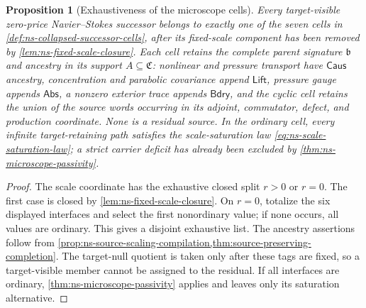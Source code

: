 \documentclass[11pt]{article}
\numberwithin{section}{part}
\theoremstyle{plain}
\newtheorem{proposition}[proposition]{Proposition}
\theoremstyle{definition}
\theoremstyle{remark}
\newcommand{\Caus}{\mathsf{Caus}}
\newcommand{\Abs}{\mathsf{Abs}}
\newcommand{\Lift}{\mathsf{Lift}}
\newcommand{\Bdry}{\mathsf{Bdry}}
\newcommand{\Channels}{\mathfrak C}
\begin{document}
\begin{proposition}[Exhaustiveness of the microscope cells]
\label{prop:ns-collapsed-cell-exhaustion}
Every target-visible zero-price Navier--Stokes successor belongs to exactly
one of the seven cells in
\cref{def:ns-collapsed-successor-cells}, after its fixed-scale component has
been removed by \cref{lem:ns-fixed-scale-closure}.  Each cell retains the
complete parent signature \(\mathfrak b\) and ancestry in its support
\(A\subseteq\Channels\): nonlinear and pressure transport have \(\Caus\)
ancestry, concentration and parabolic covariance append \(\Lift\), pressure
gauge appends \(\Abs\), a nonzero exterior trace appends \(\Bdry\), and the
cyclic cell retains the union of the source words occurring in its adjoint,
commutator, defect, and production coordinate.
None is a residual source.
In the ordinary cell, every infinite target-retaining path satisfies the
scale-saturation law \eqref{eq:ns-scale-saturation-law}; a strict carrier
deficit has already been excluded by \cref{thm:ns-microscope-passivity}.
\end{proposition}

\begin{proof}
The scale coordinate has the exhaustive closed split \(r>0\) or \(r=0\).
The first case is closed by \cref{lem:ns-fixed-scale-closure}.  On \(r=0\),
totalize the six displayed interfaces and select the first nonordinary value;
if none occurs, all values are ordinary.  This gives a disjoint exhaustive
list.  The ancestry assertions follow from
\cref{prop:ns-source-scaling-compilation,thm:source-preserving-completion}.
The target-null quotient is taken only after these tags are fixed, so a
target-visible member cannot be assigned to the residual.  If all interfaces
are ordinary, \cref{thm:ns-microscope-passivity} applies and leaves only its
saturation alternative.
\end{proof}
\end{document}
